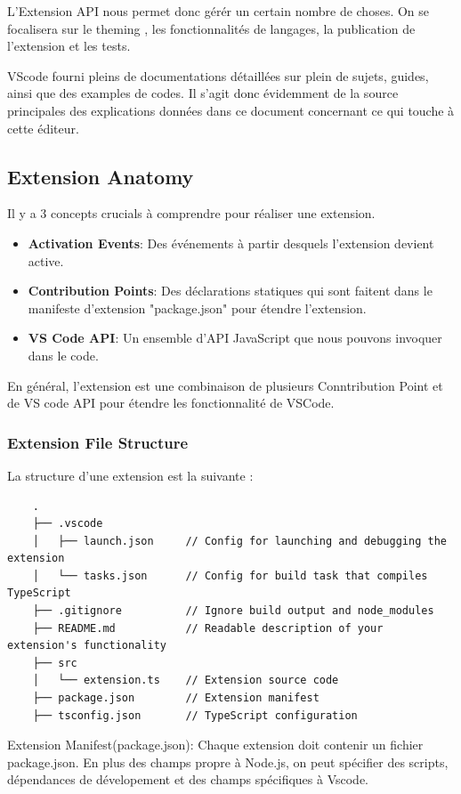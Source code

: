 \documentclass[
    iict, %
    il, %
]{heig-tb}
\begin{document}
L'Extension API nous permet donc gérér un certain nombre de choses.
On se focalisera sur le theming , les fonctionnalités de langages, la publication de l'extension et les tests.

VScode fourni pleins de documentations détaillées sur plein de sujets, guides, ainsi que des examples de codes.
Il s'agit donc évidemment de la source principales des explications données dans ce document concernant ce qui touche à cette éditeur.

\subsection{Extension Anatomy}
Il y a 3 concepts crucials à comprendre pour réaliser une extension.
\begin{itemize}
    \item \textbf{Activation Events}: Des événements à partir desquels l'extension devient active.
    \item \textbf{Contribution Points}: Des déclarations statiques qui sont faitent dans le manifeste d'extension "package.json" pour étendre l'extension.
    \item \textbf{VS Code API}: Un ensemble d'API JavaScript que nous pouvons invoquer dans le code.
\end{itemize}

En général, l'extension est une combinaison de plusieurs Conntribution Point et de VS code API pour étendre les fonctionnalité de VSCode.

\subsubsection{Extension File Structure}
La structure d'une extension est la suivante :
\begin{lstlisting}
    .
    ├── .vscode
    │   ├── launch.json     // Config for launching and debugging the extension
    │   └── tasks.json      // Config for build task that compiles TypeScript
    ├── .gitignore          // Ignore build output and node_modules
    ├── README.md           // Readable description of your extension's functionality
    ├── src
    │   └── extension.ts    // Extension source code
    ├── package.json        // Extension manifest
    ├── tsconfig.json       // TypeScript configuration
\end{lstlisting}

Extension Manifest(package.json):
Chaque extension doit contenir un fichier package.json. En plus des champs propre à Node.js, on peut spécifier des scripts, dépendances de dévelopement et des champs spécifiques à Vscode.
\end{document}

